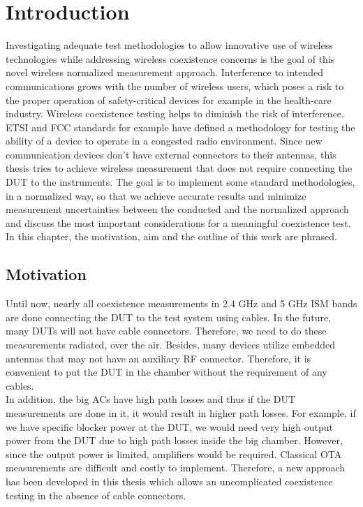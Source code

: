 \chapter{Introduction}
Investigating adequate test methodologies to allow innovative use of wireless technologies while addressing wireless coexistence concerns is the goal of this novel wireless normalized measurement approach. Interference to intended communications grows with the number of wireless users, which poses a risk to the proper operation of safety-critical devices for example in the health-care industry. Wireless coexistence testing helps to diminish the risk of interference. \acf{ETSI} and \acf{FCC} standards for example have defined a methodology for testing the ability of a device to operate in a congested radio environment. Since new communication devices don't have external connectors to their antennas, this thesis tries to achieve wireless measurement that does not require connecting the \acf{DUT} to the instruments. The goal is to implement some standard methodologies, in a normalized way, so that we achieve accurate results and minimize measurement uncertainties between the conducted and the normalized approach and discuss the most important considerations for a meaningful coexistence test. In this chapter, the motivation, aim and the outline of this work are phrased.

\section{Motivation}
Until now, nearly all coexistence measurements in 2.4 GHz and 5 GHz \ac{ISM}  bands are done connecting the \acs{DUT} to the test system using cables. In the future, many \acsp{DUT} will not have cable connectors. Therefore, we need to do these measurements radiated, over the air. Besides, many devices utilize embedded antennas that may not have an auxiliary \acs{RF} connector. Therefore, it is convenient to put the \acs{DUT} in the chamber without the requirement of any cables. \\

In addition, the big  \acp{AC} have high path losses and thus if the \acs{DUT} measurements are done in it, it would result in higher path losses. For example, if we have specific blocker power at the \acs{DUT}, we would need very high output power from the \acs{DUT} due to high path losses inside the big chamber. However, since the output power is limited, amplifiers would be required. Classical \ac{OTA} measurements are difficult and costly to implement. Therefore, a new approach has been developed in this thesis which allows an uncomplicated coexistence testing in the absence of cable connectors. 



